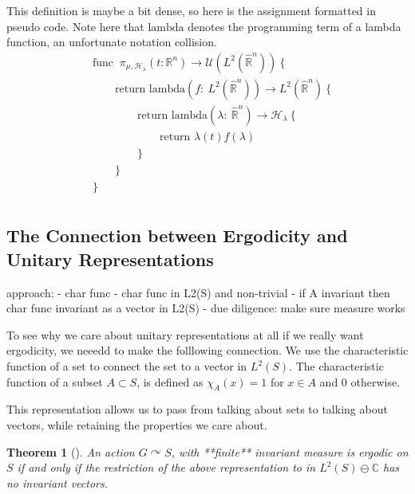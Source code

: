 \documentclass[
]{article}
\theoremstyle{break}
\newtheorem{thm}{Theorem}
\theoremstyle{plain}
\begin{document}
This definition is maybe a bit dense, so here is the assignment
formatted in pseudo code. Note here that $\text{lambda}$ denotes the
programming term of a lambda function, an unfortunate notation
collision.
\begin{align*}
& \text{func }\ \pi_{\mu,\mathscr{H}_{\lambda}}(t: \mathbb{R}^n) \rightarrow \mathcal{U}(L^2(\hat{\mathbb{R}}^n)) \ \{ \\
& \qquad \text{return lambda}(f:\ L^2(\hat{\mathbb{R}}^n)) \rightarrow L^2(\hat{\mathbb{R}}^n) \ \{ \\
& \qquad \qquad \text{return lambda}(\lambda:\ \hat{\mathbb{R}}^n) \rightarrow \mathscr{H}_{\lambda} \ \{ \\
& \qquad \qquad \qquad \text{return }\lambda(t)f(\lambda) \\
& \qquad \qquad \} \\
& \qquad \} \\
& \} \\
\end{align*}

\hypertarget{the-connection-between-ergodicity-and-unitary-representations}{%
\subsection{The Connection between Ergodicity and Unitary
Representations}\label{the-connection-between-ergodicity-and-unitary-representations}}

approach: - char func - char func in L2(S) and non-trivial - if A
invariant then char func invariant as a vector in L2(S) - due diligence:
make sure measure works

To see why we care about unitary representations at all if we really
want ergodicity, we neeedd to make the folllowing connection. We use the
characteristic function of a set to connect the set to a vector in
$L^2(S)$. The characteristic function of a subset $A\subset S$, is
defined as $\chi_A(x) = 1$ for $x \in A$ and $0$ otherwise.

This representation allows us to pass from talking about sets to talking
about vectors, while retaining the properties we care about.

\begin{thm}[]
  An action $G\curvearrowright S$, with **finite** invariant measure is ergodic
  on $S$ if and only if the restriction of the above representation to  in
  $L^2(S) \ominus \mathbb{C}$ has no invariant vectors.
\end{thm}
  
\end{document}
